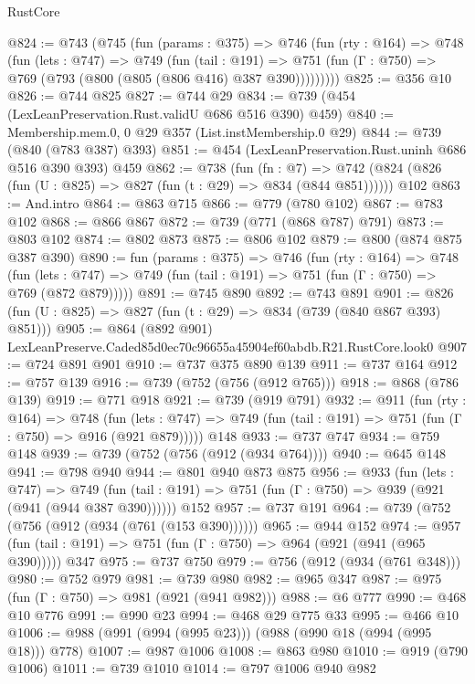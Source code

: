 \begin{lexlean}{RustCore}
\begin{coremodule}
@824 := @743
    (@745
      (fun (params : @375) =>
      @746
        (fun (rty : @164) =>
        @748
          (fun (lets : @747) =>
          @749
            (fun (tail : @191) =>
            @751 (fun (Γ : @750) => @769 (@793 (@800 (@805 (@806 @416) @387 @390)))))))))
@825 := @356 @10
@826 := @744 @825
@827 := @744 @29
@834 := @739 (@454 (LexLeanPreservation.Rust.validU @686 @516 @390) @459)
@840 := Membership.mem.{0, 0} @29 @357 (List.instMembership.{0} @29)
@844 := @739 (@840 (@783 @387) @393)
@851 := @454 (LexLeanPreservation.Rust.uninh @686 @516 @390 @393) @459
@862 := @738
    (fun (fn : @7) =>
    @742 (@824 (@826 (fun (U : @825) => @827 (fun (t : @29) => @834 (@844 @851))))))
    @102
@863 := And.intro
@864 := @863 @715
@866 := @779 (@780 @102)
@867 := @783 @102
@868 := @866 @867
@872 := @739 (@771 (@868 @787) @791)
@873 := @803 @102
@874 := @802 @873
@875 := @806 @102
@879 := @800 (@874 @875 @387 @390)
@890 := fun (params : @375) =>
  @746
    (fun (rty : @164) =>
    @748
      (fun (lets : @747) => @749 (fun (tail : @191) => @751 (fun (Γ : @750) => @769 (@872 @879)))))
@891 := @745 @890
@892 := @743 @891
@901 := @826 (fun (U : @825) => @827 (fun (t : @29) => @834 (@739 (@840 @867 @393) @851)))
@905 := @864 (@892 @901) LexLeanPreserve.Caded85d0ec70c96655a45904ef60abdb.R21.RustCore.look0
@907 := @724 @891 @901
@910 := @737 @375 @890 @139
@911 := @737 @164
@912 := @757 @139
@916 := @739 (@752 (@756 (@912 @765)))
@918 := @868 (@786 @139)
@919 := @771 @918
@921 := @739 (@919 @791)
@932 := @911
    (fun (rty : @164) =>
    @748
      (fun (lets : @747) => @749 (fun (tail : @191) => @751 (fun (Γ : @750) => @916 (@921 @879)))))
    @148
@933 := @737 @747
@934 := @759 @148
@939 := @739 (@752 (@756 (@912 (@934 @764))))
@940 := @645 @148
@941 := @798 @940
@944 := @801 @940 @873 @875
@956 := @933
    (fun (lets : @747) =>
    @749 (fun (tail : @191) => @751 (fun (Γ : @750) => @939 (@921 (@941 (@944 @387 @390))))))
    @152
@957 := @737 @191
@964 := @739 (@752 (@756 (@912 (@934 (@761 (@153 @390))))))
@965 := @944 @152
@974 := @957 (fun (tail : @191) => @751 (fun (Γ : @750) => @964 (@921 (@941 (@965 @390))))) @347
@975 := @737 @750
@979 := @756 (@912 (@934 (@761 @348)))
@980 := @752 @979
@981 := @739 @980
@982 := @965 @347
@987 := @975 (fun (Γ : @750) => @981 (@921 (@941 @982)))
@988 := @6 @777
@990 := @468 @10 @776
@991 := @990 @23
@994 := @468 @29 @775 @33
@995 := @466 @10
@1006 := @988 (@991 (@994 (@995 @23))) (@988 (@990 @18 (@994 (@995 @18))) @778)
@1007 := @987 @1006
@1008 := @863 @980
@1010 := @919 (@790 @1006)
@1011 := @739 @1010
@1014 := @797 @1006 @940 @982

\end{coremodule}
\end{lexlean}
